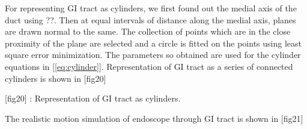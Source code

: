 \documentclass[12pt,a4]{article}
\begin{document}
For representing GI tract as cylinders, we first found out the medial axis of the duct using ??. Then at equal intervals of distance along the medial axis, planes are drawn normal to the same. The collection of points which are in the close proximity of the plane are selected and a circle is fitted on the points using least square error minimization. The parameters so obtained are used for the cylinder equations in [\ref{eq:cylinder}]. Representation of GI tract as a series of connected cylinders is shown in [fig20]

[fig20] : Representation of GI tract as cylinders.

The realistic motion simulation of endoscope through GI tract is shown in [fig21]

\begin{figure}[ht!]
    \centering
    \begin{subfigure}{0.15\textwidth}
        \centering

\end{subfigure}
\end{figure}
\end{document}

